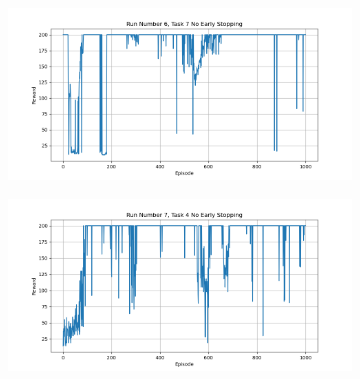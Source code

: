 \documentclass[runningheads]{llncs}
\begin{document}
\begin{figure}[H]
\begin{subfigure}{.45\textwidth}
     \end{subfigure}
      \begin{subfigure}{.45\textwidth}
          \centering
          \includegraphics[width=1\textwidth] {imgs/no_early_stopping/Task_7_run_6_no_es}
      \end{subfigure}
      \begin{subfigure}{.45\textwidth}
          \centering
          \includegraphics[width=1\textwidth] {imgs/no_early_stopping/Task_4_run_7_no_es}
      \end{subfigure}
 \end{figure}
 


\end{document}
